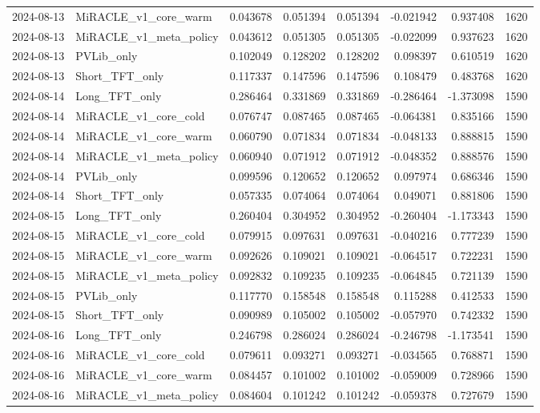 \begin{tabular}{llrrrrrr}
2024-08-13 & MiRACLE_v1_core_warm & 0.043678 & 0.051394 & 0.051394 & -0.021942 & 0.937408 & 1620 \\
2024-08-13 & MiRACLE_v1_meta_policy & 0.043612 & 0.051305 & 0.051305 & -0.022099 & 0.937623 & 1620 \\
2024-08-13 & PVLib_only & 0.102049 & 0.128202 & 0.128202 & 0.098397 & 0.610519 & 1620 \\
2024-08-13 & Short_TFT_only & 0.117337 & 0.147596 & 0.147596 & 0.108479 & 0.483768 & 1620 \\
2024-08-14 & Long_TFT_only & 0.286464 & 0.331869 & 0.331869 & -0.286464 & -1.373098 & 1590 \\
2024-08-14 & MiRACLE_v1_core_cold & 0.076747 & 0.087465 & 0.087465 & -0.064381 & 0.835166 & 1590 \\
2024-08-14 & MiRACLE_v1_core_warm & 0.060790 & 0.071834 & 0.071834 & -0.048133 & 0.888815 & 1590 \\
2024-08-14 & MiRACLE_v1_meta_policy & 0.060940 & 0.071912 & 0.071912 & -0.048352 & 0.888576 & 1590 \\
2024-08-14 & PVLib_only & 0.099596 & 0.120652 & 0.120652 & 0.097974 & 0.686346 & 1590 \\
2024-08-14 & Short_TFT_only & 0.057335 & 0.074064 & 0.074064 & 0.049071 & 0.881806 & 1590 \\
2024-08-15 & Long_TFT_only & 0.260404 & 0.304952 & 0.304952 & -0.260404 & -1.173343 & 1590 \\
2024-08-15 & MiRACLE_v1_core_cold & 0.079915 & 0.097631 & 0.097631 & -0.040216 & 0.777239 & 1590 \\
2024-08-15 & MiRACLE_v1_core_warm & 0.092626 & 0.109021 & 0.109021 & -0.064517 & 0.722231 & 1590 \\
2024-08-15 & MiRACLE_v1_meta_policy & 0.092832 & 0.109235 & 0.109235 & -0.064845 & 0.721139 & 1590 \\
2024-08-15 & PVLib_only & 0.117770 & 0.158548 & 0.158548 & 0.115288 & 0.412533 & 1590 \\
2024-08-15 & Short_TFT_only & 0.090989 & 0.105002 & 0.105002 & -0.057970 & 0.742332 & 1590 \\
2024-08-16 & Long_TFT_only & 0.246798 & 0.286024 & 0.286024 & -0.246798 & -1.173541 & 1590 \\
2024-08-16 & MiRACLE_v1_core_cold & 0.079611 & 0.093271 & 0.093271 & -0.034565 & 0.768871 & 1590 \\
2024-08-16 & MiRACLE_v1_core_warm & 0.084457 & 0.101002 & 0.101002 & -0.059009 & 0.728966 & 1590 \\
2024-08-16 & MiRACLE_v1_meta_policy & 0.084604 & 0.101242 & 0.101242 & -0.059378 & 0.727679 & 1590 \\

\end{tabular}
